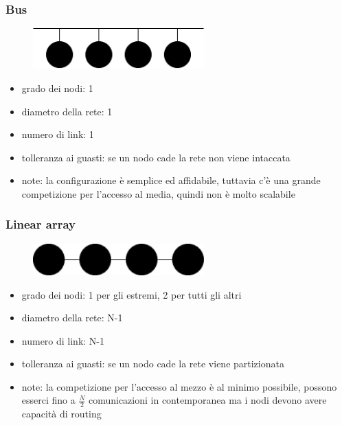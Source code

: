 \subsubsection{Bus}
\begin{figure}[H]
    \centering
    \includegraphics[width=250px]{images/2_Tassonomia_di_Flynn/Bus-topology.png}
\end{figure}

\begin{itemize}
    \item grado dei nodi: 1
    \item diametro della rete: 1
    \item numero di link: 1
    \item tolleranza ai guasti: se un nodo cade la rete non viene intaccata
    \item note: la configurazione è semplice ed affidabile, tuttavia c'è una grande competizione per l'accesso al media, quindi non è molto scalabile
\end{itemize}

\subsubsection{Linear array}
\begin{figure}[H]
    \centering
    \includegraphics[width=250px]{images/2_Tassonomia_di_Flynn/linear_array-topology.png}
\end{figure}

\begin{itemize}
    \item grado dei nodi: 1 per gli estremi, 2 per tutti gli altri
    \item diametro della rete: N-1
    \item numero di link: N-1
    \item tolleranza ai guasti: se un nodo cade la rete viene partizionata
    \item note: la competizione per l'accesso al mezzo è al minimo possibile, possono esserci fino a $\frac{N}{2}$ comunicazioni in contemporanea ma i nodi devono avere capacità di routing
\end{itemize}


